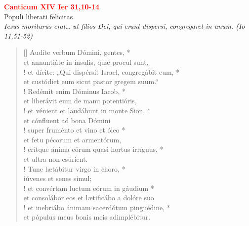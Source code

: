 


\def\greinitialformat#1{%
{\fontsize{39}{39}\selectfont #1}%
}




\vspace{0.3cm}
\begin{center}
 \textcolor{red}{\large \bf Canticum XIV Ier 31,10-14}\\
Populi liberati felicitas\\
\textit{\small Iesus moriturus erat… ut filios Dei, qui erant dispersi, congregaret in unum. (Io 11,51-52)}
\end{center}
\begin{verse}[\versewidth]
Audíte verbum Dómini, gentes, *\\
et annuntiáte in ínsulis, quæ procul sunt,\\!
\vin et dícite: „Qui dispérsit Israel, congregábit eum, *\\
\vin et custódiet eum sicut pastor gregem suum.“\\!
Redémit enim Dóminus Iacob, *\\
et liberávit eum de manu potentióris,\\!
\vin et vénient et laudábunt in monte Sion, *\\
\vin et cónfluent ad bona Dómini\\!
super fruménto et vino et óleo *\\
et fetu pécorum et armentórum,\\!
\vin erítque ánima eórum quasi hortus irríguus, *\\
\vin et ultra non esúrient.\\!
Tunc lætábitur virgo in choro, *\\
iúvenes et senes simul;\\!
\vin et convértam luctum eórum in gáudium *\\
\vin et consolábor eos et lætificábo a dolóre suo\\!
et inebriábo ánimam sacerdótum pinguédine, *\\
et pópulus meus bonis meis adimplébitur.\\
\end{verse}
\vspace{1cm}


